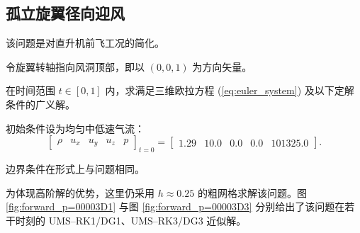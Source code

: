 \newpage{}

\subsection{孤立旋翼径向迎风}

该问题是对直升机前飞工况的简化。
\begin{problem}
[孤立旋翼径向迎风]\label{prob:=005B64=007ACB=0065CB=007FFC=005F84=005411=008FCE=0098CE}令旋翼转轴指向风洞顶部，即以
$(0,0,1)$ 为方向矢量。

在时间范围 $t\in[0,1]$ 内，求满足三维欧拉方程 (\ref{eq:euler_system}) 及以下定解条件的广义解。

初始条件设为均匀中低速气流：
\begin{equation}
\begin{bmatrix}\rho & u_{x} & u_{y} & u_{z} & p\end{bmatrix}_{t=0}=\begin{bmatrix}1.29 & 10.0 & 0.0 & 0.0 & 101325.0\end{bmatrix}.
\end{equation}

边界条件在形式上与问题相同。
\end{problem}

为体现高阶解的优势，这里仍采用 $h\approx0.25$ 的粗网格求解该问题。图 \ref{fig:forward_p=00003D1}
与图 \ref{fig:forward_p=00003D3} 分别给出了该问题在若干时刻的 UMS–RK1/DG1、UMS–RK3/DG3
近似解。

